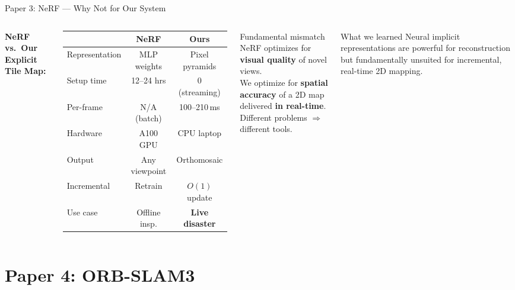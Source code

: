 \documentclass[aspectratio=169, 11pt]{beamer}
\begin{document}
\begin{frame}{Paper 3: NeRF --- Why Not for Our System}
\small
\begin{columns}[T]
\textbf{NeRF vs.\ Our Explicit Tile Map:}
\begin{table}
\centering
\renewcommand{\arraystretch}{1.15}
\begin{tabular}{lcc}
\toprule
& \textbf{NeRF} & \textbf{Ours} \\
\midrule
Representation & MLP weights & Pixel pyramids \\
Setup time & 12--24 hrs & 0 (streaming) \\
Per-frame & N/A (batch) & 100--210\,ms \\
Hardware & A100 GPU & CPU laptop \\
Output & Any viewpoint & Orthomosaic \\
Incremental & Retrain & $O(1)$ update \\
Use case & Offline insp. & \textbf{Live disaster} \\
\bottomrule
\end{tabular}
\end{table}

\begin{alertblock}{Fundamental mismatch}
NeRF optimizes for \textbf{visual quality} of novel views.\\[0.3em]
We optimize for \textbf{spatial accuracy} of a 2D map delivered \textbf{in real-time}.\\[0.3em]
Different problems $\Rightarrow$ different tools.
\end{alertblock}

\vspace{0.3em}
\begin{exampleblock}{What we learned}
Neural implicit representations are powerful for reconstruction but fundamentally unsuited for incremental, real-time 2D mapping.
\end{exampleblock}
\end{columns}
\end{frame}

\section{Paper 4: ORB-SLAM3}
\end{document}
